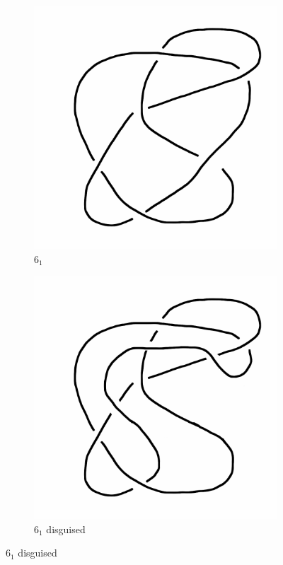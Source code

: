 \documentclass[12pt]{amsart}
\theoremstyle{definition}
\begin{document}
\begin{figure}[h]
        \centering
        \begin{subfigure}[b]{0.3\textwidth}
                \includegraphics[width=\textwidth]{knotpics/anothersix.png}
                \caption{$6_1$}
        \end{subfigure}
        \begin{subfigure}[b]{0.3\textwidth}
                \includegraphics[width=\textwidth]{knotpics/anothersix-twisted.png}
                \caption{$6_1$ disguised}
        \end{subfigure}
\end{figure}
\end{document}
